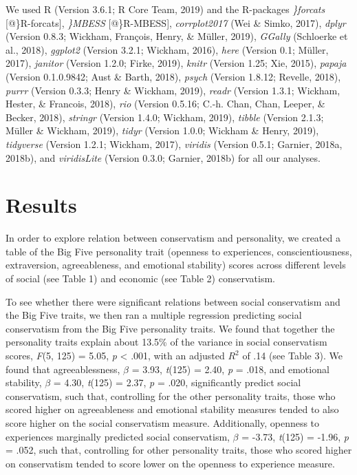 \documentclass[man]{apa6}
\begin{document}
We used R (Version 3.6.1; R Core Team, 2019) and the R-packages
\emph{\}forcats} {[}@\}R-forcats{]}, \emph{\}MBESS} {[}@\}R-MBESS{]},
\emph{corrplot2017} (Wei \& Simko, 2017), \emph{dplyr} (Version 0.8.3;
Wickham, François, Henry, \& Müller, 2019), \emph{GGally} (Schloerke et
al., 2018), \emph{ggplot2} (Version 3.2.1; Wickham, 2016), \emph{here}
(Version 0.1; Müller, 2017), \emph{janitor} (Version 1.2.0; Firke,
2019), \emph{knitr} (Version 1.25; Xie, 2015), \emph{papaja} (Version
0.1.0.9842; Aust \& Barth, 2018), \emph{psych} (Version 1.8.12; Revelle,
2018), \emph{purrr} (Version 0.3.3; Henry \& Wickham, 2019),
\emph{readr} (Version 1.3.1; Wickham, Hester, \& Francois, 2018),
\emph{rio} (Version 0.5.16; C.-h. Chan, Chan, Leeper, \& Becker, 2018),
\emph{stringr} (Version 1.4.0; Wickham, 2019), \emph{tibble} (Version
2.1.3; Müller \& Wickham, 2019), \emph{tidyr} (Version 1.0.0; Wickham \&
Henry, 2019), \emph{tidyverse} (Version 1.2.1; Wickham, 2017),
\emph{viridis} (Version 0.5.1; Garnier, 2018a, 2018b), and
\emph{viridisLite} (Version 0.3.0; Garnier, 2018b) for all our analyses.

\section{Results}\label{results}

In order to explore relation between conservatism and personality, we
created a table of the Big Five personality trait (openness to
experiences, conscientiousness, extraversion, agreeableness, and
emotional stability) scores across different levels of social (see Table
1) and economic (see Table 2) conservatism.

To see whether there were significant relations between social
conservatism and the Big Five traits, we then ran a multiple regression
predicting social conservatism from the Big Five personality traits. We
found that together the personality traits explain about 13.5\% of the
variance in social conservatism scores, \emph{F}(5, 125) = 5.05,
\emph{p} \textless{} .001, with an adjusted \(R^2\) of .14 (see Table
3). We found that agreeablessness, \(\beta\) = 3.93, \emph{t}(125) =
2.40, \emph{p} = .018, and emotional stability, \(\beta\) = 4.30,
\emph{t}(125) = 2.37, \emph{p} = .020, significantly predict social
conservatism, such that, controlling for the other personality traits,
those who scored higher on agreeableness and emotional stability
measures tended to also score higher on the social conservatism measure.
Additionally, openness to experiences marginally predicted social
conservatism, \(\beta\) = -3.73, \emph{t}(125) = -1.96, \emph{p} = .052,
such that, controlling for other personality traits, those who scored
higher on conservatism tended to score lower on the openness to
experience measure.
\end{document}

